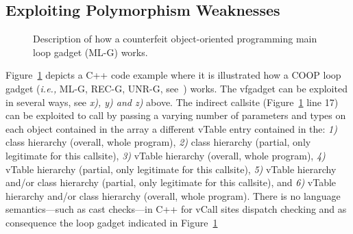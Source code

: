 \subsection{Exploiting Polymorphism Weaknesses}
\label{Exploiting Polymorphism Weaknesses}
 \begin{figure}[!h]
   \vspace{-.45cm}
   \centering
\vspace{-2.6cm}
\caption{Description of how a counterfeit object-oriented programming main loop gadget (ML-G) works.}
\label{Code example used to illustrate how a COOP loop gadget works}
\end{figure}
Figure~\ref{Code example used to illustrate how a COOP loop gadget works}
depicts a C++ code example where it is illustrated how a COOP loop gadget 
(\textit{i.e.,} ML-G, REC-G, UNR-G, see~\cite{crane:readactor++}) works.
The vfgadget  can be exploited in several ways, see \textit{x), y) and z)} above.
The indirect callsite (Figure~\ref{Code example used to illustrate how a COOP loop gadget works} line 17) can be exploited 
to call by passing a varying number of parameters and types
on each object contained in the array a different
vTable entry contained in the:
\textit{1)} class hierarchy (overall, whole program),
\textit{2)} class hierarchy (partial, only legitimate for this callsite),
\textit{3)} vTable hierarchy (overall, whole program),
\textit{4)} vTable hierarchy (partial, only legitimate for this callsite),
\textit{5)} vTable hierarchy and/or class hierarchy (partial, only legitimate for this callsite), and
\textit{6)} vTable hierarchy and/or class hierarchy (overall, whole program).
There is no language semantics---such as cast checks---in C++ for vCall sites dispatch checking and as consequence
the loop gadget indicated in Figure~\ref{Code example used to illustrate how a COOP loop gadget works}
